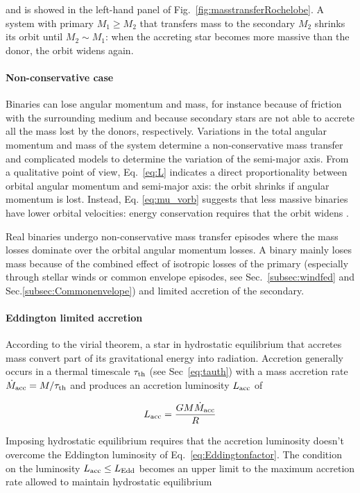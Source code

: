 \documentclass[a4paper,titlepage]{book}     	%
\newcommand{\mdot}{\ensuremath{\dot{M}}}
\begin{document}
and is showed in the left-hand panel of Fig.\ \ref{fig:masstransferRochelobe}. A system with primary $M_1 \geq M_2$ that transfers mass to the secondary $M_2$ shrinks its orbit until $M_2 \sim M_1$: when the accreting star becomes more massive than the donor, the orbit widens again.

\paragraph{Non-conservative case} Binaries can lose angular momentum and mass, for instance because of friction with the surrounding medium and because secondary stars are not able to accrete all the mass lost by the donors, respectively. Variations in the total angular momentum and mass of the system determine a non-conservative mass transfer and complicated models to determine the variation of the semi-major axis. From a qualitative point of view, Eq.\ \ref{eq:L} indicates a direct proportionality between orbital angular momentum and semi-major axis: the orbit shrinks if angular momentum is lost. Instead, Eq. \ref{eq:mu_vorb} suggests that less massive binaries have lower orbital velocities: energy conservation requires that the orbit widens \cite{Hurley2002}. 

Real binaries undergo non-conservative mass transfer episodes where the mass losses dominate over the orbital angular momentum losses. A binary mainly loses mass because of the combined effect of isotropic losses of the primary (especially through stellar winds or common envelope episodes, see Sec.\ \ref{subsec:windfed} and Sec.\ref{subsec:Commonenvelope}) and limited accretion of the secondary. 

\paragraph{Eddington limited accretion}
According to the virial theorem, a star in hydrostatic equilibrium that accretes mass convert part of its gravitational energy into radiation. Accretion generally occurs in a thermal timescale $\tau_{\rm th}$ (see Sec\ \ref{eq:tauth}) with a mass accretion rate $\mdot_{\rm acc} = M/\tau_{\rm th}$ and produces an accretion luminosity $L_{\rm acc}$ of

\begin{equation}
L_\textup{acc} = \frac{G M \mdot_{\rm acc}}{R}
\end{equation}

Imposing hydrostatic equilibrium requires that the accretion luminosity doesn't overcome the Eddington luminosity of Eq.\ \ref{eq:Eddingtonfactor}. The condition on the luminosity $L_{\rm acc} \leq L_{\rm Edd}$ becomes an upper limit to the maximum accretion rate allowed to maintain hydrostatic equilibrium
\end{document}
